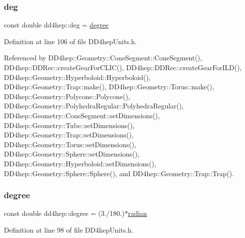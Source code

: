 \subsubsection{\texorpdfstring{deg}{deg}}
{\footnotesize\ttfamily const double dd4hep\+::deg = \hyperlink{namespacedd4hep_a9fbc5184e0fbd4235e8efb28cc3ab3af}{degree}\hspace{0.3cm}{\ttfamily [static]}}



Definition at line 106 of file D\+D4hep\+Units.\+h.



Referenced by D\+D4hep\+::\+Geometry\+::\+Cone\+Segment\+::\+Cone\+Segment(), D\+D4hep\+::\+D\+D\+Rec\+::create\+Gear\+For\+C\+L\+I\+C(), D\+D4hep\+::\+D\+D\+Rec\+::create\+Gear\+For\+I\+L\+D(), D\+D4hep\+::\+Geometry\+::\+Hyperboloid\+::\+Hyperboloid(), D\+D4hep\+::\+Geometry\+::\+Trap\+::make(), D\+D4hep\+::\+Geometry\+::\+Torus\+::make(), D\+D4hep\+::\+Geometry\+::\+Polycone\+::\+Polycone(), D\+D4hep\+::\+Geometry\+::\+Polyhedra\+Regular\+::\+Polyhedra\+Regular(), D\+D4hep\+::\+Geometry\+::\+Cone\+Segment\+::set\+Dimensions(), D\+D4hep\+::\+Geometry\+::\+Tube\+::set\+Dimensions(), D\+D4hep\+::\+Geometry\+::\+Trap\+::set\+Dimensions(), D\+D4hep\+::\+Geometry\+::\+Torus\+::set\+Dimensions(), D\+D4hep\+::\+Geometry\+::\+Sphere\+::set\+Dimensions(), D\+D4hep\+::\+Geometry\+::\+Hyperboloid\+::set\+Dimensions(), D\+D4hep\+::\+Geometry\+::\+Sphere\+::\+Sphere(), and D\+D4hep\+::\+Geometry\+::\+Trap\+::\+Trap().

\hypertarget{namespacedd4hep_a9fbc5184e0fbd4235e8efb28cc3ab3af}{}\label{namespacedd4hep_a9fbc5184e0fbd4235e8efb28cc3ab3af} 
\subsubsection{\texorpdfstring{degree}{degree}}
{\footnotesize\ttfamily const double dd4hep\+::degree = (3./180.)$\ast$\hyperlink{namespacedd4hep_aa67a6662923dd0138a6bf6713eddcebb}{radian}\hspace{0.3cm}{\ttfamily [static]}}



Definition at line 98 of file D\+D4hep\+Units.\+h.

\hypertarget{namespacedd4hep_a18365e1a8b0f1730924219e336e11e9f}{}\label{namespacedd4hep_a18365e1a8b0f1730924219e336e11e9f} 
